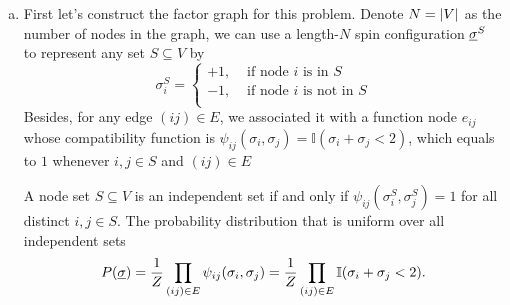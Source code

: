 \documentclass[a4paper,oneside,12pt]{article}
\begin{document}
\begin{itemize}
    \begin{solution} $\,$ 
    \begin{enumerate}[(a)]
    \item   
            First let's construct the factor graph for this problem.
            Denote $ N = \left| V \right| $ as the number of nodes in the graph, we can use a length-$ N $ spin configuration $ \underline{\sigma}^S $ to represent any set $ S \subseteq V $ by
            \begin{equation*}
                \sigma_i^S = 
                \begin{cases}
                    +1, &\text{ if node } i \text{ is in } S\\
                    -1, &\text{ if node } i \text{ is not in } S\\
                \end{cases}
            \end{equation*}
            Besides, for any edge $ (ij) \in E $, we associated it with a function node $ e_{ij} $ whose compatibility function is $ \psi_{ij}(\sigma_i, \sigma_j) = \mathbb{I}(\sigma_i + \sigma_j < 2) $, which equals to $ 1 $ whenever $ i,j \in S $ and $ (ij) \in E $

            A node set $ S \subseteq V $ is an independent set if and only if $ \psi_{ij}(\sigma_i^S, \sigma_j^S) = 1 $ for all distinct $ i,j \in S $.
            The probability distribution that is uniform over all independent sets
            \begin{equation} \label{eq:2_1}
                P(\underline{\sigma})
                = \frac{1}{Z} \prod_{(ij) \in E} \psi_{ij}(\sigma_i, \sigma_j)
                = \frac{1}{Z} \prod_{(ij) \in E} \mathbb{I}(\sigma_i + \sigma_j < 2).
            \end{equation}
            

\end{enumerate}
\end{solution}
\end{itemize}
\end{document}
